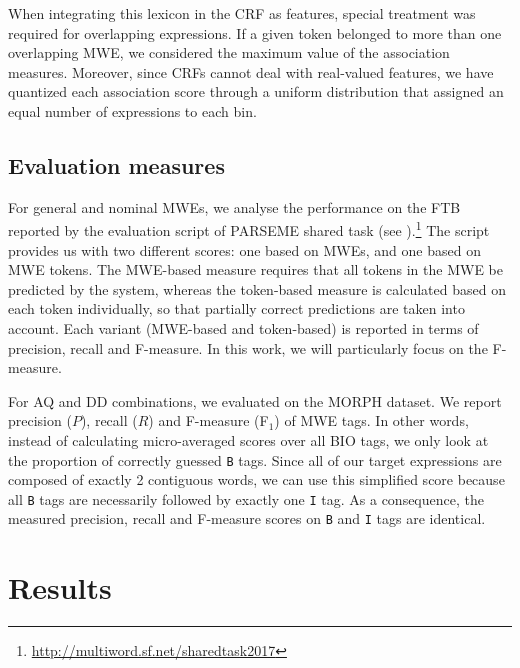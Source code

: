 \documentclass[output=paper,modfonts]{langscibook}
\begin{document}
When integrating this lexicon in the CRF as features, special treatment was required for overlapping expressions. If a given token belonged to more than one overlapping MWE, we considered the maximum value of the association measures. Moreover, since CRFs cannot deal with real-valued features, we have quantized each association score through a uniform distribution that assigned an equal number of expressions to each bin.


\subsection{Evaluation measures}
\label{subsec:evalmeas}

For general and nominal MWEs, we analyse the performance on the FTB reported by the evaluation script of PARSEME shared task (see ).\footnote{\url{http://multiword.sf.net/sharedtask2017}} The script provides us with two different scores: one based on MWEs, and one based on MWE tokens. The MWE-based measure requires that all tokens in the MWE be predicted by the system, whereas the token-based measure is calculated based on each token individually, so that partially correct predictions are taken into account. Each variant (MWE-based and token-based) is reported in terms of precision, recall and F-measure. In this work, we will particularly focus on the F-measure. 

For AQ and DD combinations, we evaluated on the MORPH dataset. We report precision ($P$), recall ($R$) and F-measure (F$_1$) of MWE tags. In other words, instead of calculating micro-averaged scores over all BIO tags, we only look at the proportion of correctly guessed \texttt{B} tags.
Since all of our target expressions are composed of exactly 2 contiguous words, we can use this simplified score because all \texttt{B} tags are necessarily followed by exactly one \texttt{I} tag. As a consequence, the measured precision, recall and F-measure scores on \texttt{B} and \texttt{I} tags are identical.

\section{Results}
\label{schol:sec:results}
\end{document}
